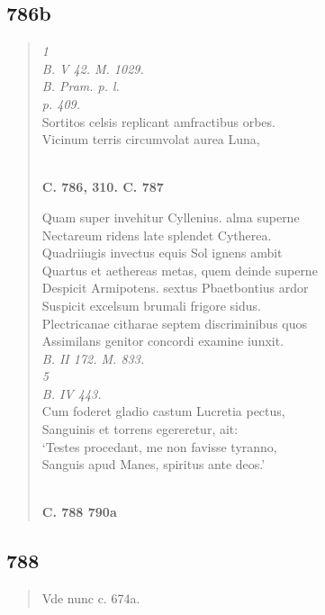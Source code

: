 \documentclass[11pt, a4paper]{report}
\begin{document}
            \subsection*{786b}
      \begin{verse}
      \textit{1} \\ \textit{B. V 42. M. 1029.} \\ \textit{B. Pram. p. l.} \\ \textit{p. 409.} \\ Sortitos celsis replicant amfractibus orbes. \\ Vicinum terris circumvolat aurea Luna, \\ 
        ﻿\pagebreak 
    \begin{center} \textbf{C. 786, 310. C. 787} \end{center} \marginpar{[267]} Quam super invehitur Cyllenius. alma superne \\ Nectareum ridens late splendet Cytherea. \\ Quadriiugis invectus equis Sol ignens ambit \\ Quartus et aethereas metas, quem deinde superne \\ Despicit Armipotens. sextus Pbaetbontius ardor \\ Suspicit excelsum brumali frigore sidus. \\ Plectricanae citharae septem discriminibus quos \\ Assimilans genitor concordi examine iunxit. \\ \textit{B. II 172. M. 833.} \\ \textit{5} \\ \textit{B. IV 443.} \\ Cum foderet gladio castum Lucretia pectus, \\ Sanguinis et torrens egereretur, ait: \\ ‘Testes procedant, me non favisse tyranno, \\ Sanguis apud Manes, spiritus ante deos.’ \\ 
        ﻿\pagebreak 
    \begin{center} \textbf{C. 788 790a} \end{center} \marginpar{[268]} 
      \end{verse}
  
            \subsection*{788}
      \begin{verse}
      Vde nunc c. 674a. \\ 
      \end{verse}
  
\end{document}
